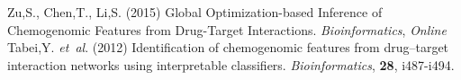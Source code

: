 \documentclass[a0,portrait]{a0poster}
\begin{document}
\begin{multicols}{2}
\begin{thebibliography}{}
Zu,S., Chen,T., Li,S. (2015) Global Optimization-based Inference of Chemogenomic Features from Drug-Target Interactions. \textit{Bioinformatics}, \textit{Online}
 Tabei,Y. \textit{et~al}. (2012) Identification of chemogenomic features from drug--target interaction networks using interpretable classifiers. \textit{Bioinformatics}, \textbf{28}, i487-i494.
\end{thebibliography}



\end{multicols}
\end{document}
